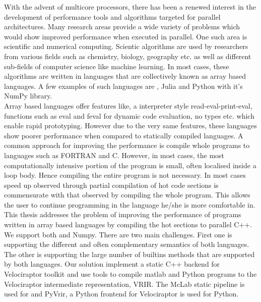 With the advent of multicore processors, there has been a renewed interest in the development of performance tools and algorithms targeted for parallel architectures. Many research areas  provide a wide variety of problems which would show improved performance when executed in parallel. One such area is scientific and numerical computing. Scientic algorithms are used by researchers from various fields such as chemistry, biology, geography etc. as well as different sub-fields of computer science like machine learning. In most cases, these algorithms are written in languages  that are collectively known as  array based languages. A few examples of such languages are \matlab\cite{matlab}, Julia\cite{julia} and Python\cite{python} with it's NumPy\cite{numpy} library.\\
Array based languages offer features like, a interpreter style read-eval-print-eval, functions such as eval and feval for dynamic code evaluation, no types etc. which enable rapid prototyping. However due to the very same features, these languages show poorer performance when compared to statically compiled languages. A common approach for improving the performance is compile whole programs to languages such as {\sc FORTRAN} and C. However, in most cases, the most computationally intensive portion of the program is small, often localised inside a loop body. Hence compiling the entire program is not necessary. In most cases speed up observed through partial compilation of hot code sections is commensurate with that observed by compiling the whole program. This allows the user to continue programming in the language he/she is more comfortable in.\\
This thesis addresses the problem of improving the performance of programs written in array based languages by compiling the hot sections to parallel C++. We support both \matlab\cite{matlab} and Numpy\cite{numpy}. There are two main challenges. First one is supporting the different and often complementary semantics of both languages. The other is supporting the large number of builtins methods that are supported by both languages.
Our solution implement a static C++ backend for Velociraptor\cite{velociraptor} toolkit and use tools to compile matlab\cite{matlab} and Python\cite{python} programs to the Velociraptor\cite{velociraptor} intermediate representation, VRIR. The McLab static pipeline is used for \matlab\cite{matlab} and PyVrir, a Python\cite{python} frontend for Velociraptor\cite{velociraptor} is used for Python\cite{python}. 
